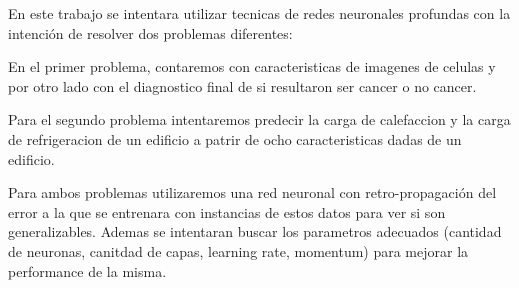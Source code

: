 En este trabajo se intentara utilizar tecnicas de redes neuronales profundas con la intención de resolver dos problemas diferentes:

En el primer problema, contaremos con caracteristicas de imagenes de celulas y por otro lado con el diagnostico final de si resultaron ser cancer o no cancer.

Para el segundo problema intentaremos predecir la carga de calefaccion y la carga de refrigeracion de un edificio a patrir de ocho caracteristicas dadas de un edificio.

Para ambos problemas utilizaremos una red neuronal con retro-propagación del error a la que se entrenara con instancias de estos datos para ver si son generalizables. Ademas se intentaran buscar los parametros adecuados (cantidad de neuronas, canitdad de capas, learning rate, momentum) para mejorar la performance de la misma.